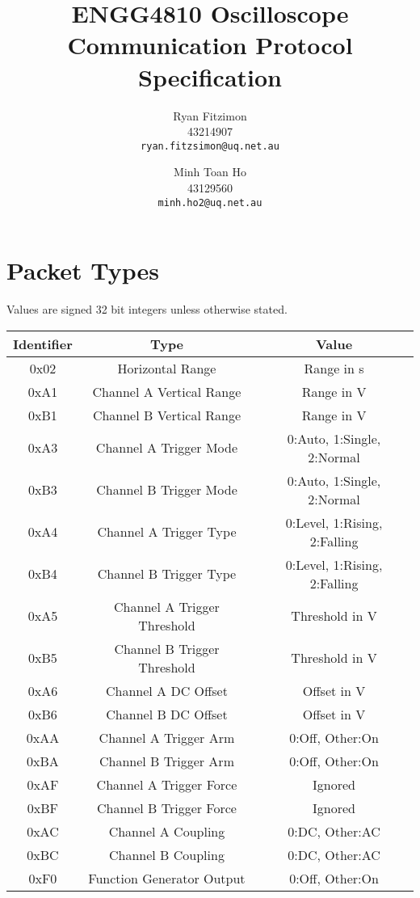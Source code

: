 \documentclass[]{article}
\title{ENGG4810 Oscilloscope Communication Protocol Specification}
\author{
	Ryan Fitzimon\\
	43214907\\
	\texttt{ryan.fitzsimon@uq.net.au}
	\and
	Minh Toan Ho\\
	43129560\\
	\texttt{minh.ho2@uq.net.au}
}
\begin{document}
\maketitle

\section{Packet Types}

Values are signed 32 bit integers unless otherwise stated.

\begin{table}[H]
	\renewcommand{\arraystretch}{1.2}
	\centering
	\begin{tabular}{|c|c|c|}
		\hline
		\textbf{Identifier} & \textbf{Type} & \textbf{Value} \\ \hline
		0x02 & Horizontal Range & Range in \textmu s \\ \hline
		0xA1 & Channel A Vertical Range & Range in \textmu V \\ \hline
		0xB1 & Channel B Vertical Range & Range in \textmu V \\ \hline
		0xA3 & Channel A Trigger Mode & 0:Auto, 1:Single, 2:Normal \\ \hline
		0xB3 & Channel B Trigger Mode & 0:Auto, 1:Single, 2:Normal \\ \hline
		0xA4 & Channel A Trigger Type & 0:Level, 1:Rising, 2:Falling \\ \hline
		0xB4 & Channel B Trigger Type & 0:Level, 1:Rising, 2:Falling \\ \hline
		0xA5 & Channel A Trigger Threshold & Threshold in \textmu V \\ \hline
		0xB5 & Channel B Trigger Threshold & Threshold in \textmu V \\ \hline
		0xA6 & Channel A DC Offset & Offset in \textmu V \\ \hline
		0xB6 & Channel B DC Offset & Offset in \textmu V \\ \hline
		0xAA & Channel A Trigger Arm & 0:Off, Other:On \\ \hline 
		0xBA & Channel B Trigger Arm & 0:Off, Other:On \\ \hline 
		0xAF & Channel A Trigger Force & Ignored \\ \hline 
		0xBF & Channel B Trigger Force & Ignored \\ \hline 
		0xAC & Channel A Coupling & 0:DC, Other:AC \\ \hline
		0xBC & Channel B Coupling & 0:DC, Other:AC \\ \hline
		0xF0 & Function Generator Output & 0:Off, Other:On \\ \hline

\end{tabular}
\end{table}
\end{document}

